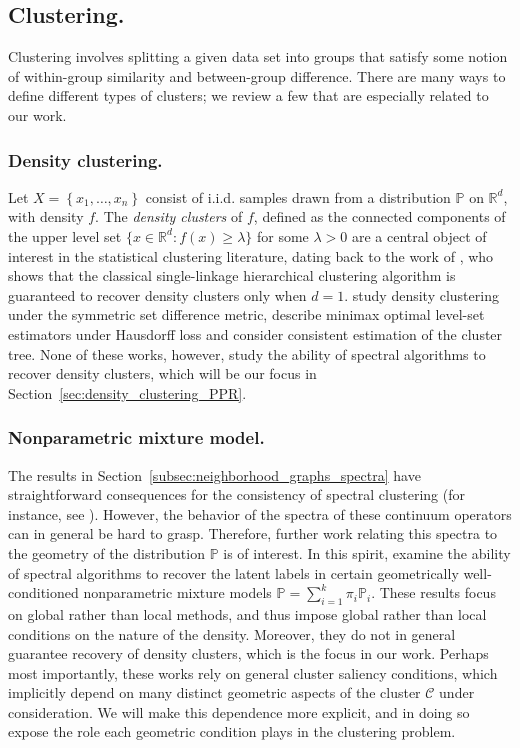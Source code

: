 \documentclass{article}
\newcommand{\Reals}{\mathbb{R}}
\newcommand{\set}[1]{\left\{#1\right\}}
\newcommand{\1}{\mathbf{1}}
\newcommand{\Rd}{\Reals^d}
\newcommand{\Cset}{\mathcal{C}}
\newcommand{\Pbb}{\mathbb{P}}
\theoremstyle{alden}
\theoremstyle{aldenthm}
\theoremstyle{definition}
\theoremstyle{remark}
\begin{document}
\subsection{Clustering.}

Clustering involves splitting a given data set
into groups that satisfy some notion of within-group similarity and
between-group difference. There are many ways to define different types of clusters; we review a few that are especially related to our work. 

\subsubsection{Density clustering.}

Let $X = \set{x_1,\ldots,x_n}$ consist of i.i.d. samples drawn from a distribution $\Pbb$ on $\Reals^d$, with density $f$. The \emph{density clusters} of $f$, defined as the connected components of
the upper level set $\{x \in \Rd : f(x) \geq \lambda\}$ for some $\lambda > 0$
are a central object of interest in the statistical clustering literature, dating
back to the work of \citet{hartigan1981}, who shows that the classical single-linkage hierarchical clustering algorithm is guaranteed to recover density clusters only when $d = 1$. \citet{polonik1995, rigollet2009} study density clustering under the 
symmetric set difference metric, \citet{tsybakov1997, singh2009} describe
minimax optimal level-set estimators under Hausdorff loss and
\citet{hartigan1981, chaudhuri2010, balakrishnan2013,kpotufe11} consider consistent estimation of the
cluster tree. None of these works, however, study the ability of spectral algorithms to recover density clusters, which will be our focus in Section~\ref{sec:density_clustering_PPR}.

\subsubsection{Nonparametric mixture model.}

The results in Section~\ref{subsec:neighborhood_graphs_spectra} have straightforward consequences for the consistency of spectral clustering (for instance, see \cite{vonluxburg2008,garciatrillos18}). However, the behavior of the spectra of these continuum operators can in general be hard to grasp. Therefore, further work relating this spectra to the geometry of the distribution $\Pbb$ is of interest. In this spirit, \citet{shi2009,schiebinger2015,garciatrillos19,ariascastro11} examine the ability of spectral algorithms to recover the latent labels in certain geometrically well-conditioned nonparametric mixture models $\Pbb = \sum_{i = 1}^{k} \pi_i \Pbb_i$. These results focus on global rather than local 
methods, and thus impose global rather than local conditions on the nature
of the density. Moreover, they do not in general guarantee recovery of density 
clusters, which is the focus in our work. Perhaps most importantly, these works
rely on general cluster saliency conditions, which implicitly depend on many
distinct geometric aspects of the cluster $\Cset$ under consideration. We will make
this dependence more explicit, and in doing so expose the role each geometric
condition plays in the clustering problem. 
\end{document}
